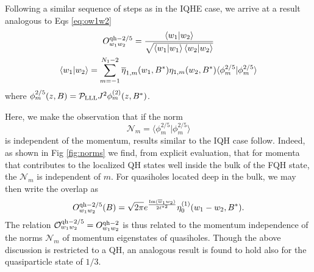\documentclass[twocolumn,floatfix,prb,aps,showpacs]{revtex4-2}
\newcommand{\be}{\begin{equation}}
\newcommand{\ee}{\end{equation}}
\newcommand{\IO}{\mathcal{O}}
\begin{document}
\begin{appendix}
Following a similar sequence of steps as in the IQHE case, we arrive at a result analogous to Eqs \ref{eq:ow1w2}
\begin{gather}
O^{{\rm qh}-2/5}_{w_1w_2}=\frac{\left \langle w_1 | w_2\right \rangle}{\sqrt{\left \langle w_1 | w_1\right \rangle \left \langle w_2 | w_2\right \rangle}}\label{eq:o25w1w2}\\
\left \langle w_1 | w_2\right \rangle=\sum_{m=-1}^{N_1-2} \overline{\eta}_{1,m}(w_1,B^*)\eta_{1,m}(w_2,B^*)  \langle \phi^{2/5}_m | \phi^{2/5}_m  \rangle \nonumber
\end{gather}
where $\phi^{2/5}_m(z,B)=\mathcal{P}_{\rm LLL} J^2 \phi^{(2)}_m(z,B^*)$. 


Here, we make the observation that if the norm 
\be
\mathcal{N}_m=  \langle \phi^{2/5}_m | \phi^{2/5}_m  \rangle 
\label{eq:norm}
\ee
 is independent of the momentum, results similar to the IQH case follow. 
Indeed, as shown in Fig \ref{fig:norms} we find, from explicit evaluation, that for momenta that contributes to the localized QH states well inside the bulk of the FQH state, the $\mathcal{N}_m$ is independent of $m$. 
For quasiholes located deep in the bulk, we may then write the overlap as 
\begin{equation}
O^{{\rm qh}-2/5}_{w_1w_2}(B) =  \sqrt{2\pi}e^{\frac{{\rm Im}(\overline{w}_1w_2)}{2\ell^{*2}} } \eta^{(1)}_{0}(w_1-w_2,B^*).
\end{equation}
The relation $\IO^{{\rm qh}-2/5}_{w_1w_2}=O^{{\rm qh}-2}_{w_1w_2}$ 
is thus related to the momentum independence of the norms $\mathcal{N}_m$ of momentum eigenstates of quasiholes. Though the above discussion is restricted to a QH, an analogous result is found to hold also for the quasiparticle state of $1/3$.








\end{appendix}
\end{document}
